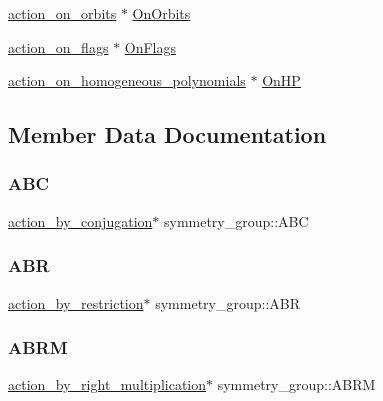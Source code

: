 \begin{DoxyCompactItemize}
\item 
\mbox{\hyperlink{classaction__on__orbits}{action\+\_\+on\+\_\+orbits}} $\ast$ \mbox{\hyperlink{unionsymmetry__group_aa36d8ab0db15a149683ba5110722456c}{On\+Orbits}}
\item 
\mbox{\hyperlink{classaction__on__flags}{action\+\_\+on\+\_\+flags}} $\ast$ \mbox{\hyperlink{unionsymmetry__group_aea37cdb36cac8fe0273547d81e07ce1d}{On\+Flags}}
\item 
\mbox{\hyperlink{classaction__on__homogeneous__polynomials}{action\+\_\+on\+\_\+homogeneous\+\_\+polynomials}} $\ast$ \mbox{\hyperlink{unionsymmetry__group_a711d31a9d09e6e560b6f3f53f52bf692}{On\+HP}}
\end{DoxyCompactItemize}


\subsection{Member Data Documentation}
\mbox{\label{unionsymmetry__group_a17f8687b4d15bc7c7ac0084648866306}} 
\subsubsection{\texorpdfstring{A\+BC}{ABC}}
{\footnotesize\ttfamily \mbox{\hyperlink{classaction__by__conjugation}{action\+\_\+by\+\_\+conjugation}}$\ast$ symmetry\+\_\+group\+::\+A\+BC}

\mbox{\label{unionsymmetry__group_a4b89b4123c703bda2164913dc8bd43ec}} 
\subsubsection{\texorpdfstring{A\+BR}{ABR}}
{\footnotesize\ttfamily \mbox{\hyperlink{classaction__by__restriction}{action\+\_\+by\+\_\+restriction}}$\ast$ symmetry\+\_\+group\+::\+A\+BR}

\mbox{\label{unionsymmetry__group_ab873c5aa9ffc4dab6c542473841c71d3}} 
\subsubsection{\texorpdfstring{A\+B\+RM}{ABRM}}
{\footnotesize\ttfamily \mbox{\hyperlink{classaction__by__right__multiplication}{action\+\_\+by\+\_\+right\+\_\+multiplication}}$\ast$ symmetry\+\_\+group\+::\+A\+B\+RM}

